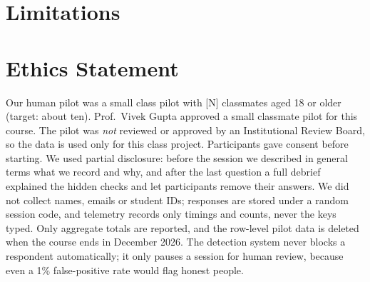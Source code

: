 \documentclass[11pt]{article}
\begin{document}
\section*{Limitations}

\section*{Ethics Statement}
Our human pilot was a small class pilot with [N] classmates aged 18 or older (target: about ten).
Prof.~Vivek Gupta approved a small classmate pilot for this course. The pilot was \emph{not}
reviewed or approved by an Institutional Review Board, so the data is used only for this class
project. Participants gave consent before starting. We used partial disclosure: before the
session we described in general terms what we record and why, and after the last question a
full debrief explained the hidden checks and let participants remove their answers. We did not
collect names, emails or student IDs; responses are stored under a random session code, and
telemetry records only timings and counts, never the keys typed. Only aggregate totals are
reported, and the row-level pilot data is deleted when the course ends in December 2026. The detection system never blocks a respondent automatically; it only pauses a session
for human review, because even a 1\% false-positive rate would flag honest people.

\nocite{*}

\end{document}
